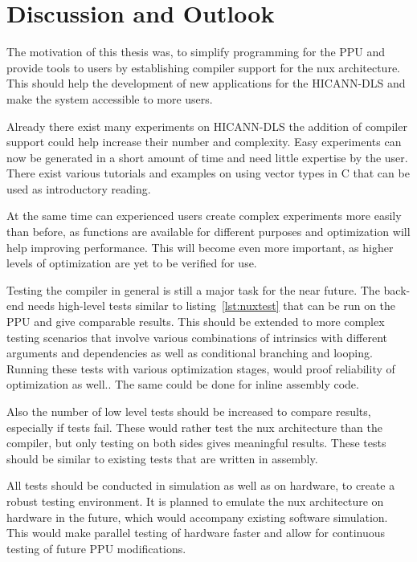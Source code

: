 \chapter{Discussion and Outlook}
\label{chapter:discussion}

The motivation of this thesis was, to simplify programming for the \ac{PPU} and provide tools to users by establishing compiler support for the nux architecture.
This should help the development of new applications for the \ac{HICANN-DLS} and make the system accessible to more users.

Already there exist many experiments on \ac{HICANN-DLS} the addition of compiler support could help increase their number and complexity.
Easy experiments can now be generated in a short amount of time and need little expertise by the user.
There exist various tutorials and examples on using vector types in C  that can be used as introductory reading.

At the same time can experienced users create complex experiments more easily than before, as functions are available for different purposes and optimization will help improving performance.
This will become even more important, as higher levels of optimization are yet to be verified for use.

Testing the compiler in general is still a major task for the near future.
The back-end needs high-level tests similar to listing~\ref{lst:nuxtest} that can be run on the \ac{PPU} and give comparable results.
This should be extended to more complex testing scenarios that involve various combinations of intrinsics with different arguments and dependencies as well as conditional branching and looping.
Running these tests with various optimization stages, would proof reliability of optimization as well..
The same could be done for inline assembly code.

Also the number of low level tests should be increased to compare results, especially if tests fail.
These would rather test the nux architecture than the compiler, but only testing on both sides gives meaningful results.
These tests should be similar to existing tests that are written in assembly.

All tests should be conducted in simulation as well as on hardware, to create a robust testing environment.
It is planned to emulate the nux architecture on hardware in the future, which would accompany existing software simulation.
This would make parallel testing of hardware faster and allow for continuous testing of future \ac{PPU} modifications.

